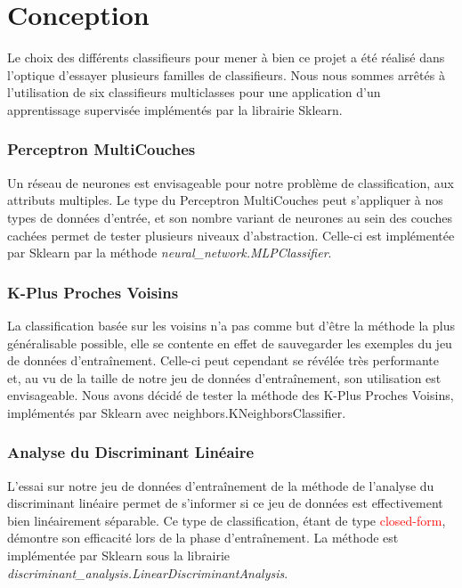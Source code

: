 \section{Conception}
Le choix des différents classifieurs pour mener à bien ce projet a été réalisé dans l'optique d'essayer plusieurs familles de classifieurs. Nous nous sommes arrêtés à l'utilisation de six classifieurs multiclasses pour une application d'un apprentissage supervisée implémentés par la librairie Sklearn.

\subsubsection*{Perceptron MultiCouches}
Un réseau de neurones est envisageable pour notre problème de classification, aux attributs multiples. Le type du Perceptron MultiCouches peut s'appliquer à nos types de données d'entrée, et son nombre variant de neurones au sein des couches cachées permet de tester plusieurs niveaux d'abstraction. Celle-ci est implémentée par Sklearn par la méthode \emph{neural\_network.MLPClassifier}.

\subsubsection*{K-Plus Proches Voisins}
La classification basée sur les voisins n'a pas comme but d'être la méthode la plus généralisable possible, elle se contente en effet de sauvegarder les exemples du jeu de données d'entraînement. Celle-ci peut cependant se révélée très performante et, au vu de la taille de notre jeu de données d'entraînement, son utilisation est envisageable.
Nous avons décidé de tester la méthode des K-Plus Proches Voisins, implémentés par Sklearn avec neighbors.KNeighborsClassifier.

\subsubsection*{Analyse du Discriminant Linéaire}
L'essai sur notre jeu de données d'entraînement de la méthode de l'analyse du discriminant linéaire permet de s'informer si ce jeu de données est effectivement bien linéairement séparable. Ce type de classification, étant de type \textcolor{red}{closed-form}, démontre son efficacité lors de la phase d'entraînement. La méthode est implémentée par Sklearn sous la librairie \emph{discriminant\_analysis.LinearDiscriminantAnalysis}.

